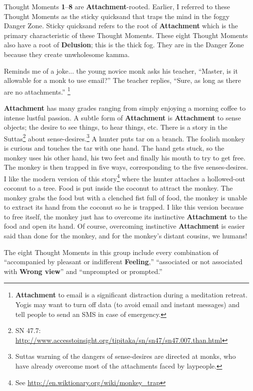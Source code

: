 Thought Moments \textbf{1}--\textbf{8} are \textbf{Attachment}-rooted. Earlier, I referred to these Thought Moments as the sticky quicksand that traps the mind in the foggy Danger Zone. Sticky quicksand refers to the root of \textbf{Attachment} which is the primary characteristic of these Thought Moments. These eight Thought Moments also have a root of \textbf{Delusion}; this is the thick fog. They are in the Danger Zone because they create unwholesome kamma.

Reminds me of a joke... the young novice monk asks his teacher, “Master, is it allowable for a monk to use email?” The teacher replies, “Sure, as long as there are no attachments.” \footnote{\textbf{Attachment} to email is a significant distraction during a meditation retreat. Yogis may want to turn off data (to avoid email and instant messages) and tell people to send an SMS in case of emergency.}

\textbf{Attachment} has many grades ranging from simply enjoying a morning coffee to intense lustful passion. A subtle form of \textbf{Attachment} is \textbf{Attachment} to sense objects; the desire to see things, to hear things, etc. There is a story in the Suttas\footnote{SN 47.7: \url{http://www.accesstoinsight.org/tipitaka/sn/sn47/sn47.007.than.html}} about sense-desires.\footnote{Suttas warning of the dangers of sense-desires are directed at monks, who have already overcome most of the attachments faced by laypeople.} A hunter puts tar on a branch. The foolish monkey is curious and touches the tar with one hand. The hand gets stuck, so the monkey uses his other hand, his two feet and finally his mouth to try to get free. The monkey is then trapped in five ways, corresponding to the five senses-desires. I like the modern version of this story\footnote{See \url{http://en.wiktionary.org/wiki/monkey_trap}} where the hunter attaches a hollowed-out coconut to a tree. Food is put inside the coconut to attract the monkey. The monkey grabs the food but with a clenched fist full of food, the monkey is unable to extract its hand from the coconut so he is trapped. I like this version because to free itself, the monkey just has to overcome its instinctive \textbf{Attachment} to the food and open its hand. Of course, overcoming instinctive \textbf{Attachment} is easier said than done for the monkey, and for the monkey’s distant cousins, we humans!

The eight Thought Moments in this group include every combination of “accompanied by pleasant or indifferent \textbf{Feeling},” “associated or not associated with \textbf{Wrong view}” and “unprompted or prompted.”

